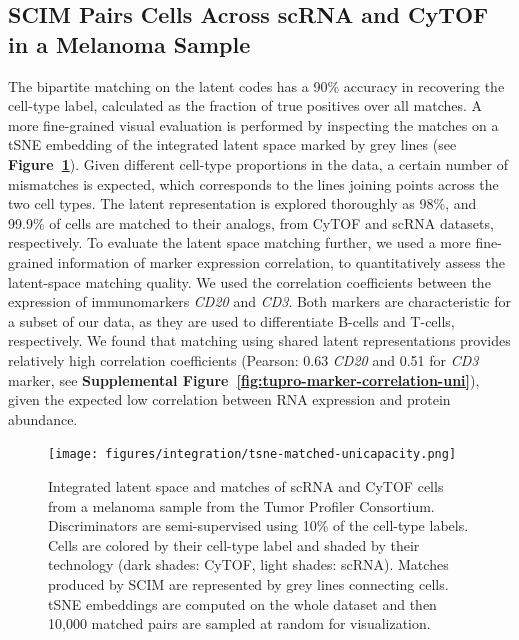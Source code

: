 \subsection{SCIM Pairs Cells Across scRNA and CyTOF in a Melanoma Sample}
The bipartite matching on the latent codes has a 90\% accuracy in recovering the cell-type label, calculated as the fraction of true positives over all matches.
A more fine-grained visual evaluation is performed by inspecting the matches on a tSNE embedding of the integrated latent space marked by grey lines (see \textbf{Figure~\ref{fig:tupro-tsne-uni}}).
Given different cell-type proportions in the data, a certain number of mismatches is expected, which corresponds to the lines joining points across the two cell types.
The latent representation is explored thoroughly as 98\%, and 99.9\% of cells are matched to their analogs, from CyTOF and scRNA datasets, respectively.
To evaluate the latent space matching further, we used a more fine-grained information of marker expression correlation, to quantitatively assess the latent-space matching quality.
We used the correlation coefficients between the expression of immunomarkers \textit{CD20} and \textit{CD3}.
Both markers are characteristic for a subset of our data, as they are used to differentiate B-cells and T-cells, respectively.
We found that matching using shared latent representations provides relatively high correlation coefficients
(Pearson: 0.63 \textit{CD20} and 0.51 for \textit{CD3} marker, see \textbf{Supplemental Figure~\ref{fig:tupro-marker-correlation-uni}}),
given the expected low correlation between RNA expression and protein abundance.

\begin{figure}[htbp]
    \centering
    \texttt{[image: figures/integration/tsne-matched-unicapacity.png]}
    \caption{
    Integrated latent space and matches of scRNA and CyTOF cells from a melanoma sample from the Tumor Profiler Consortium.
    Discriminators are semi-supervised using 10\% of the cell-type labels.
    Cells are colored by their cell-type label and shaded by their technology (dark shades: CyTOF, light shades: scRNA).
    Matches produced by SCIM are represented by grey lines connecting cells.
    tSNE embeddings \cite{Maaten2008} are computed on the whole dataset and then 10,000 matched pairs are sampled at random for visualization.}
    \label{fig:tupro-tsne-uni}
\end{figure}


